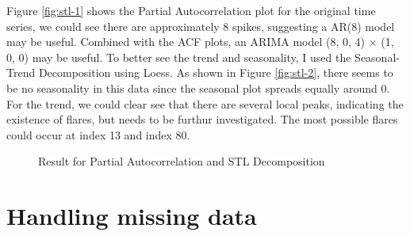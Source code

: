\documentclass[
]{article}
\begin{document}
Figure \ref{fig:stl-1} shows the Partial Autocorrelation plot for the original time series, we could see there are approximately 8 spikes, suggesting a AR(8) model may be useful. Combined with the ACF plots, an ARIMA model (8, 0, 4) \(\times\) (1, 0, 0) may be useful. To better see the trend and seasonality, I used the Seasonal-Trend Decomposition using Loess. As shown in Figure \ref{fig:stl-2}, there seems to be no seasonality in this data since the seasonal plot spreads equally around 0. For the trend, we could clear see that there are several local peaks, indicating the existence of flares, but needs to be furthur investigated. The most possible flares could occur at index 13 and index 80.

\begin{figure}[H]

{\centering {}

}

\caption{Result for Partial Autocorrelation and STL Decomposition}\label{fig:stl}
\end{figure}

\section{Handling missing data}\label{handling-missing-data}
\end{document}

